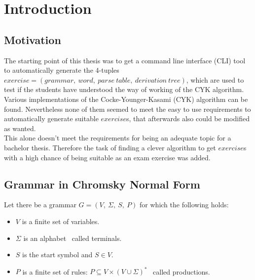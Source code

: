 
\section{Introduction}\label{Introduction}

\subsection{Motivation}

The starting point of this thesis was to get a command line interface (CLI) tool to automatically generate the 4-tuples $exercise = (grammar,\ word,\ parse\ table,\ derivation\ tree)$, which are used to test if the students have understood the way of working of the CYK algorithm.\\
Various implementations of the Cocke-Younger-Kasami (CYK) algorithm can be found. Nevertheless none of them seemed to meet the easy to use requirements to automatically generate suitable $exercise$s, that afterwards also could be modified as wanted.\\
This alone doesn't meet the requirements for being an adequate topic for a bachelor thesis. Therefore the task of finding a clever algorithm to get $exercise$s with a high chance of being suitable as an exam exercise was added. 

\subsection{Grammar in Chromsky Normal Form}

\noindent Let there be a grammar $G=(V,\ \Sigma,\ S,\ P)$ for which the following holds:
\begin{itemize}
	\item $V$ is a finite set of variables.
	\item $\Sigma$ is an alphabet \textendash~called terminals.
	\item $S$ is the start symbol and $S \in V$.
	\item $P$ is a finite set of rules: $P \subseteq V \times (V \cup \Sigma)^{*}$ \textendash~called productions.
\end{itemize}

